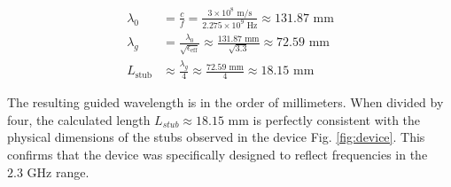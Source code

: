 \begin{align*}
\lambda_0 &= \frac{c}{f} = \frac{3 \times 10^8 \text{ m/s}}{2.275 \times 10^9 \text{ Hz}} \approx 131.87 \text{ mm} \\[10pt]
\lambda_g &= \frac{\lambda_0}{\sqrt{\epsilon_{\text{eff}}}} \approx \frac{131.87 \text{ mm}}{\sqrt{3.3}} \approx 72.59 \text{ mm} \\[10pt]
L_{\text{stub}} &\approx \frac{\lambda_g}{4} \approx \frac{72.59 \text{ mm}}{4} \approx 18.15 \text{ mm}
\end{align*}

The resulting guided wavelength is in the order of millimeters. When divided by four, the calculated length $L_{stub} \approx 18.15 \text{ mm}$ is perfectly consistent with the physical dimensions of the stubs observed in the device Fig. \ref{fig:device}. This confirms that the device was specifically designed to reflect frequencies in the $2.3 \text{ GHz}$ range.
